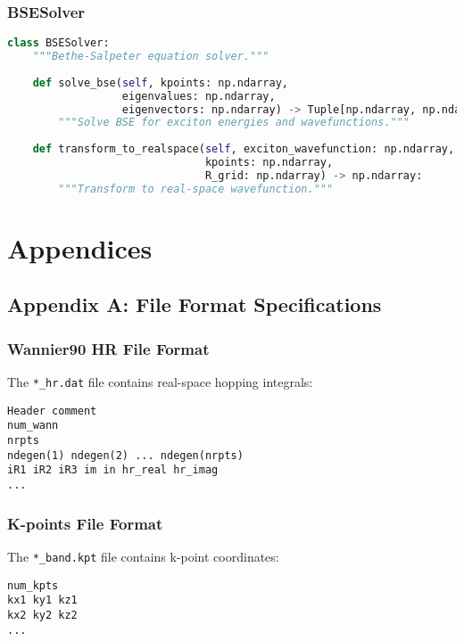 \documentclass[11pt,a4paper]{article}
\newcommand{\code}[1]{\texttt{#1}}
\begin{document}
\subsubsection{BSESolver}

\begin{lstlisting}[language=Python]
class BSESolver:
    """Bethe-Salpeter equation solver."""
    
    def solve_bse(self, kpoints: np.ndarray, 
                  eigenvalues: np.ndarray,
                  eigenvectors: np.ndarray) -> Tuple[np.ndarray, np.ndarray]:
        """Solve BSE for exciton energies and wavefunctions."""
        
    def transform_to_realspace(self, exciton_wavefunction: np.ndarray,
                               kpoints: np.ndarray,
                               R_grid: np.ndarray) -> np.ndarray:
        """Transform to real-space wavefunction."""
\end{lstlisting}

\section{Appendices}

\subsection{Appendix A: File Format Specifications}

\subsubsection{Wannier90 HR File Format}

The \code{*\_hr.dat} file contains real-space hopping integrals:

\begin{verbatim}
Header comment
num_wann
nrpts
ndegen(1) ndegen(2) ... ndegen(nrpts)
iR1 iR2 iR3 im in hr_real hr_imag
...
\end{verbatim}

\subsubsection{K-points File Format}

The \code{*\_band.kpt} file contains k-point coordinates:

\begin{verbatim}
num_kpts
kx1 ky1 kz1
kx2 ky2 kz2
...
\end{verbatim}
\end{document}
